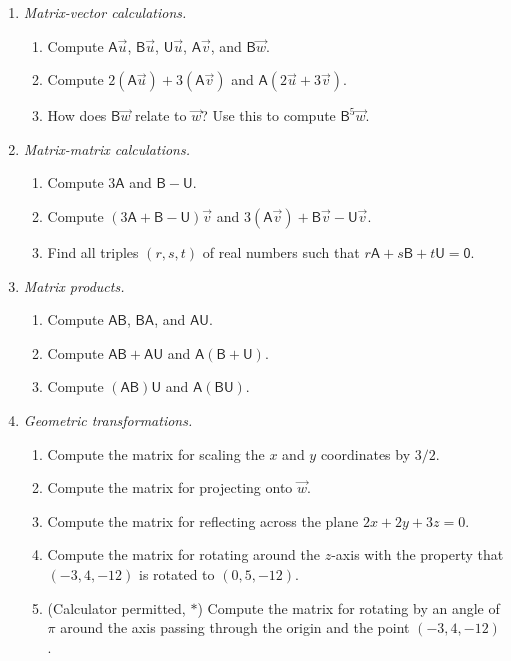 \begin{enumerate}
\item \emph{Matrix-vector calculations.}
\begin{enumerate}
\item Compute $\mathsf{A}\vec{u}$, $\mathsf{B}\vec{u}$, $\mathsf{U}\vec{u}$, $\mathsf{A}\vec{v}$, and $\mathsf{B}\vec{w}$.
\item Compute $2(\mathsf{A}\vec{u}) + 3(\mathsf{A}\vec{v})$ and $\mathsf{A}(2\vec{u} + 3\vec{v})$.
\item How does $\mathsf{B}\vec{w}$ relate to $\vec{w}$? Use this to compute $\mathsf{B}^5\vec{w}$.
\end{enumerate}
\item \emph{Matrix-matrix calculations.}
\begin{enumerate}
\item Compute $3\mathsf{A}$ and $\mathsf{B} - \mathsf{U}$.
\item Compute $(3\mathsf{A} + \mathsf{B} - \mathsf{U})\vec{v}$ and $3(\mathsf{A}\vec{v}) + \mathsf{B}\vec{v} - \mathsf{U}\vec{v}$.
\item Find all triples $(r,s,t)$ of real numbers such that $r\mathsf{A} + s\mathsf{B} + t\mathsf{U} = \mathsf{0}$.
\end{enumerate}
\item \emph{Matrix products.}
\begin{enumerate}
\item Compute $\mathsf{AB}$, $\mathsf{BA}$, and $\mathsf{AU}$.
\item Compute $\mathsf{AB} + \mathsf{AU}$ and $\mathsf{A}(\mathsf{B} + \mathsf{U})$.
\item Compute $(\mathsf{AB})\mathsf{U}$ and $\mathsf{A}(\mathsf{BU})$.
\end{enumerate}
\item \emph{Geometric transformations.}
\begin{enumerate}
\item Compute the matrix for scaling the $x$ and $y$ coordinates by $3/2$.
\item Compute the matrix for projecting onto $\vec{w}$.
\item Compute the matrix for reflecting across the plane $2x + 2y + 3z = 0$.
\item Compute the matrix for rotating around the $z$-axis with the property that $(-3,4,-12)$ is rotated to $(0,5,-12)$.
\item (Calculator permitted, $*$) Compute the matrix for rotating by an angle of $\pi$ around the axis passing through the origin and the point $(-3,4,-12)$.

\end{enumerate}
\end{enumerate}
